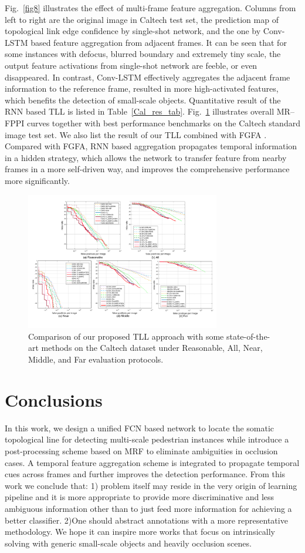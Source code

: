 \documentclass[runningheads]{llncs}
\begin{document}
Fig.~\ref{fig8} illustrates the effect of multi-frame feature aggregation. Columns from left to right are the original image in Caltech test set, the prediction map of topological link edge confidence by single-shot network, and the one by Conv-LSTM based feature aggregation from adjacent frames. It can be seen that for some instances with defocus, blurred boundary and extremely tiny scale, the output feature activations from single-shot network are feeble, or even disappeared. In contrast, Conv-LSTM effectively aggregates the adjacent frame information to the reference frame, resulted in more high-activated features, which benefits the detection of small-scale objects.
Quantitative result of the RNN based TLL is listed in Table~\ref{Cal_res_tab}. Fig.~\ref{fig9} illustrates overall MR--FPPI curves together with best performance benchmarks on the Caltech standard image test set. We also list the result of our TLL combined with FGFA \cite{FGFA}. Compared with FGFA, RNN based aggregation propagates temporal information in a hidden strategy, which allows the network to transfer feature from nearby frames in a more self-driven way, and improves the comprehensive performance more significantly.
\begin{figure}[t]
	\centering
	\includegraphics[height=6.0cm]{9_results.pdf}
	\caption{Comparison of our proposed TLL approach with some state-of-the-art methods on the Caltech dataset under Reasonable, All, Near, Middle, and Far evaluation protocols.}
	\label{fig9}
\end{figure}

\section{Conclusions}
In this work, we design a unified FCN based network to locate the somatic topological line for detecting multi-scale pedestrian instances while introduce a post-processing scheme based on MRF to eliminate ambiguities in occlusion cases. A temporal feature aggregation scheme is integrated to propagate temporal cues across frames and further improves the detection performance. From this work we conclude that: 1) problem itself may reside in the very origin of learning pipeline and it is more appropriate to provide more discriminative and less ambiguous information other than to just feed more information for achieving a better classifier. 2)One should abstract annotations with a more representative methodology. We hope it can inspire more works that focus on intrinsically solving with generic small-scale objects and heavily occlusion scenes.
\end{document}
